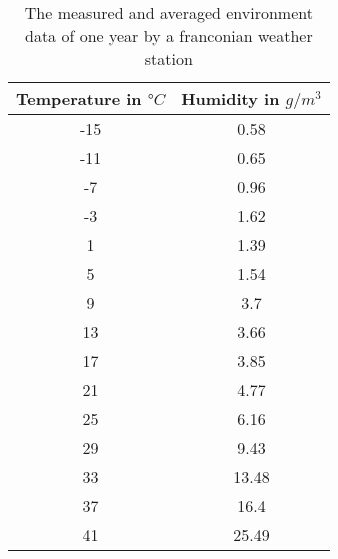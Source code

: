 \begin{table}[h!]
\centering
\begin{tabular}
{| c | c |}
\hline
 Temperature in $°C$ & Humidity in $g/m^3$ \\ 
\hline
 -15 & 0.58 \\ 
\hline
 -11 & 0.65 \\ 
\hline
 -7 & 0.96 \\ 
\hline
 -3 & 1.62 \\ 
\hline
 1 & 1.39 \\ 
\hline
 5 & 1.54 \\ 
\hline
 9 & 3.7 \\ 
\hline
 13 & 3.66 \\ 
\hline
 17 & 3.85 \\ 
\hline
 21 & 4.77 \\ 
\hline
 25 & 6.16 \\ 
\hline
 29 & 9.43 \\ 
\hline
 33 & 13.48 \\ 
\hline
 37 & 16.4 \\ 
\hline
 41 & 25.49 \\ 
\hline
\end{tabular}
\label{tab:EnvironmentData}
\caption{The measured and averaged environment data of one year by a franconian weather station}
\end{table}
